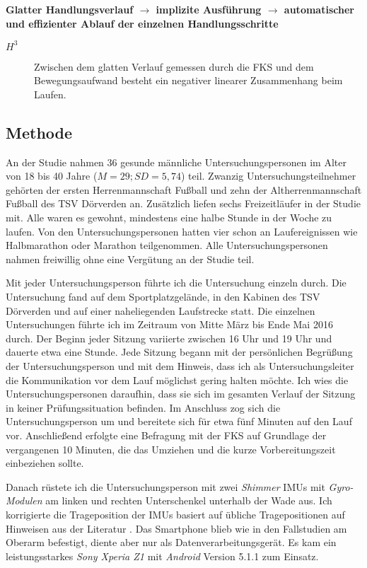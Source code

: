 \textbf{Glatter Handlungsverlauf $\rightarrow$ implizite Ausführung $\rightarrow$ automatischer und effizienter Ablauf der einzelnen Handlungsschritte} 
\begin{description}
	\item[$H^3$] Zwischen dem glatten Verlauf gemessen durch die \ac{FKS} und dem Bewegungsaufwand besteht ein negativer linearer Zusammenhang beim Laufen.
\end{description}

\subsection{Methode}
An der Studie nahmen 36 gesunde männliche Untersuchungspersonen im Alter von 18 bis 40 Jahre ($M = 29; SD = 5{,}74$) teil. Zwanzig Untersuchungsteilnehmer gehörten der ersten Herrenmannschaft Fußball und zehn der Altherrenmannschaft Fußball des TSV Dörverden an. Zusätzlich liefen sechs Freizeitläufer in der Studie mit. Alle waren es gewohnt, mindestens eine halbe Stunde in der Woche zu laufen. Von den Untersuchungspersonen hatten vier schon an Laufereignissen wie Halbmarathon oder Marathon teilgenommen. Alle Untersuchungspersonen nahmen freiwillig ohne eine Vergütung an der Studie teil. 

Mit jeder Untersuchungsperson führte ich die Untersuchung einzeln durch. Die Untersuchung fand auf dem Sportplatzgelände, in den Kabinen des TSV Dörverden und auf einer naheliegenden Laufstrecke statt. Die einzelnen Untersuchungen führte ich im Zeitraum von Mitte März bis Ende Mai 2016 durch. Der Beginn jeder Sitzung variierte zwischen 16 Uhr und 19 Uhr und dauerte etwa eine Stunde. Jede Sitzung begann mit der persönlichen Begrüßung der Untersuchungsperson und mit dem Hinweis, dass ich als Untersuchungsleiter die Kommunikation vor dem Lauf möglichst gering halten möchte. Ich wies die Untersuchungspersonen daraufhin, dass sie sich im gesamten Verlauf der Sitzung in keiner Prüfungssituation befinden. Im Anschluss zog sich die Untersuchungsperson um und bereitete sich für etwa fünf Minuten auf den Lauf vor. Anschließend erfolgte eine Befragung mit der \ac{FKS} auf Grundlage der vergangenen 10 Minuten, die das Umziehen und die kurze Vorbereitungszeit einbeziehen sollte. 

Danach rüstete ich die Untersuchungsperson mit zwei \emph{Shimmer} \acp{IMU} mit \emph{Gyro-Modulen} am linken und rechten Unterschenkel unterhalb der Wade aus. Ich korrigierte die Trageposition der \acp{IMU} basiert auf übliche Tragepositionen auf Hinweisen aus der Literatur \citep[vgl.][]{Hreljac1993}. Das Smartphone blieb wie in den Fallstudien am Oberarm befestigt, diente aber nur als Datenverarbeitungsgerät. Es kam ein leistungsstarkes \emph{Sony Xperia Z1} mit \emph{Android} Version 5.1.1 zum Einsatz.

